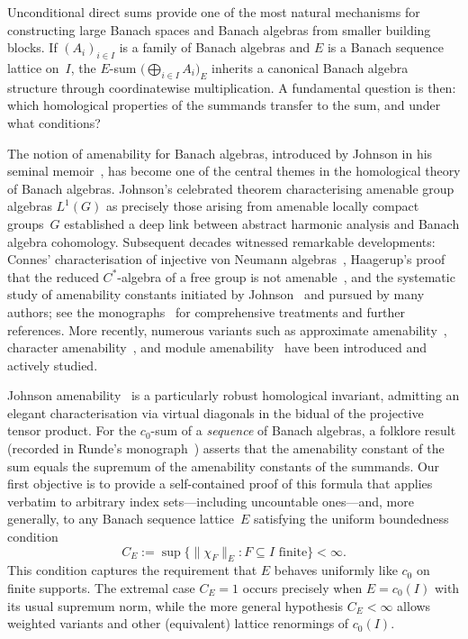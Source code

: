 \documentclass[reqno]{amsart}
\theoremstyle{plain}
\theoremstyle{definition}
\theoremstyle{remark}
\begin{document}
Unconditional direct sums provide one of the most natural mechanisms for constructing
large Banach spaces and Banach algebras from smaller building blocks.
If $(A_i)_{i\in I}$ is a family of Banach algebras and $E$ is a Banach sequence lattice on~$I$,
the $E$-sum $\bigl(\bigoplus_{i\in I} A_i\bigr)_{\!E}$ inherits a canonical Banach algebra structure
through coordinatewise multiplication.
A fundamental question is then: which homological properties of the summands transfer to the sum,
and under what conditions?

The notion of amenability for Banach algebras, introduced by Johnson in his seminal
memoir~\cite{Johnson1972Cohomology}, has become one of the central themes in the
homological theory of Banach algebras.
Johnson's celebrated theorem characterising amenable group algebras $L^1(G)$ as precisely
those arising from amenable locally compact groups~$G$ established a deep link between
abstract harmonic analysis and Banach algebra cohomology.
Subsequent decades witnessed remarkable developments: Connes' characterisation of
injective von Neumann algebras~\cite{Connes1976}, Haagerup's proof that the reduced
$C^*$-algebra of a free group is not amenable~\cite{Haagerup1983},
and the systematic study of amenability constants initiated by
Johnson~\cite{Johnson1994} and pursued by many authors;
see the monographs~\cite{Helemskii1989,Dales2000,Runde2002Lectures,Runde2020ABA}
for comprehensive treatments and further references.
More recently, numerous variants such as approximate amenability~\cite{GhahramaniLoy2004},
character amenability~\cite{SanganiMonfared2008}, and module amenability~\cite{Amini2004} have
been introduced and actively studied.

Johnson amenability~\cite{Johnson1972Cohomology} is a particularly robust homological invariant,
admitting an elegant characterisation via virtual diagonals in the bidual of the projective tensor product.
For the $c_0$-sum of a \emph{sequence} of Banach algebras, a folklore result
(recorded in Runde's monograph~\cite{Runde2020ABA}) asserts that the amenability constant of the sum
equals the supremum of the amenability constants of the summands.
Our first objective is to provide a self-contained proof of this formula that applies verbatim
to arbitrary index sets---including uncountable ones---and, more generally,
to any Banach sequence lattice~$E$ satisfying the uniform boundedness condition
\[
C_E := \sup\bigl\{\|\chi_F\|_E : F \subseteq I \text{ finite}\bigr\} < \infty.
\]
This condition captures the requirement that $E$ behaves uniformly like $c_0$ on finite supports.
The extremal case $C_E=1$ occurs precisely when $E=c_0(I)$ with its usual supremum norm,
while the more general hypothesis $C_E<\infty$ allows weighted variants and other (equivalent)
lattice renormings of $c_0(I)$.
\end{document}
